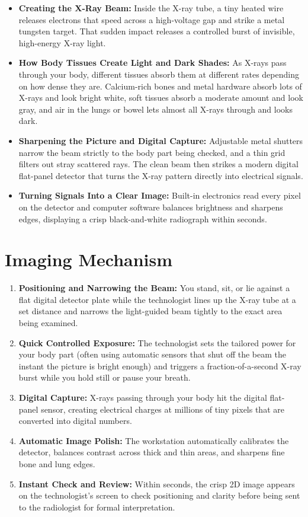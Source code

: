 \begin{itemize}
    \item \textbf{Creating the X-Ray Beam:} Inside the X-ray tube, a tiny heated wire releases electrons that speed across a high-voltage gap and strike a metal tungsten target. That sudden impact releases a controlled burst of invisible, high-energy X-ray light.
    \item \textbf{How Body Tissues Create Light and Dark Shades:} As X-rays pass through your body, different tissues absorb them at different rates depending on how dense they are. Calcium-rich bones and metal hardware absorb lots of X-rays and look bright white, soft tissues absorb a moderate amount and look gray, and air in the lungs or bowel lets almost all X-rays through and looks dark.
    \item \textbf{Sharpening the Picture and Digital Capture:} Adjustable metal shutters narrow the beam strictly to the body part being checked, and a thin grid filters out stray scattered rays. The clean beam then strikes a modern digital flat-panel detector that turns the X-ray pattern directly into electrical signals.
    \item \textbf{Turning Signals Into a Clear Image:} Built-in electronics read every pixel on the detector and computer software balances brightness and sharpens edges, displaying a crisp black-and-white radiograph within seconds.
\end{itemize}

\section{Imaging Mechanism}

\begin{enumerate}
    \item \textbf{Positioning and Narrowing the Beam:} You stand, sit, or lie against a flat digital detector plate while the technologist lines up the X-ray tube at a set distance and narrows the light-guided beam tightly to the exact area being examined.
    \item \textbf{Quick Controlled Exposure:} The technologist sets the tailored power for your body part (often using automatic sensors that shut off the beam the instant the picture is bright enough) and triggers a fraction-of-a-second X-ray burst while you hold still or pause your breath.
    \item \textbf{Digital Capture:} X-rays passing through your body hit the digital flat-panel sensor, creating electrical charges at millions of tiny pixels that are converted into digital numbers.
    \item \textbf{Automatic Image Polish:} The workstation automatically calibrates the detector, balances contrast across thick and thin areas, and sharpens fine bone and lung edges.
    \item \textbf{Instant Check and Review:} Within seconds, the crisp 2D image appears on the technologist's screen to check positioning and clarity before being sent to the radiologist for formal interpretation.
\end{enumerate}

